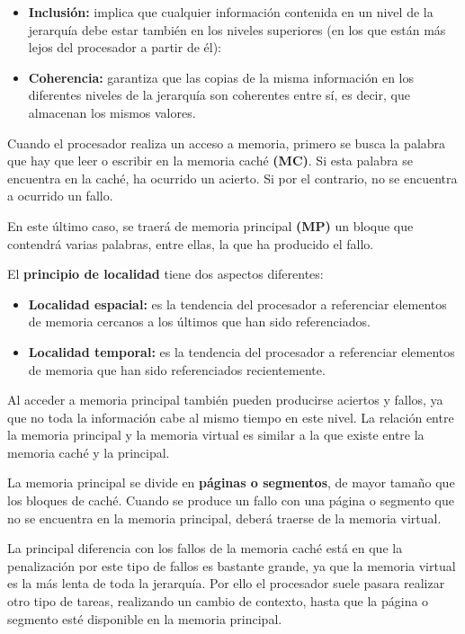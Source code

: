 \begin{itemize}
  \item \textbf{Inclusión:} implica que cualquier información contenida en un nivel de la jerarquía debe estar también en los niveles superiores (en los que están más lejos del procesador a partir de él):
  \item \textbf{Coherencia:} garantiza que las copias de la misma información en los diferentes niveles de la jerarquía son coherentes entre sí, es decir, que almacenan los mismos valores.
\end{itemize}

Cuando el procesador realiza un acceso a memoria, primero se busca la palabra que hay que leer o escribir en la memoria caché \textbf{(MC)}. Si esta palabra se encuentra en la caché, ha ocurrido un acierto. Si por el contrario, no se encuentra a ocurrido un fallo.

En este último caso, se traerá de memoria principal \textbf{(MP)} un bloque que contendrá varias palabras, entre ellas, la que ha producido el fallo.

El \textbf{principio de localidad} tiene dos aspectos diferentes:

\begin{itemize}
  \item \textbf{Localidad espacial:} es la tendencia del procesador a referenciar elementos de memoria cercanos a los últimos que han sido referenciados.
  \item \textbf{Localidad temporal:} es la tendencia del procesador a referenciar elementos de memoria que han sido referenciados recientemente.
\end{itemize}

Al acceder a memoria principal también pueden producirse aciertos y fallos, ya que no toda la información cabe al mismo tiempo en este nivel. La relación entre la memoria principal y la memoria virtual es similar a la que existe entre la memoria caché y la principal.

La memoria principal se divide en \textbf{páginas o segmentos}, de mayor tamaño que los bloques de caché. Cuando se produce un fallo con una página o segmento que no se encuentra en la memoria principal, deberá traerse de la memoria virtual.

La principal diferencia con los fallos de la memoria caché está en que la penalización por este tipo de fallos es bastante grande, ya que la memoria virtual es la más lenta de toda la jerarquía. Por ello el procesador suele pasara  realizar otro tipo de tareas, realizando un cambio de contexto, hasta que la página o segmento esté disponible en la memoria principal.

